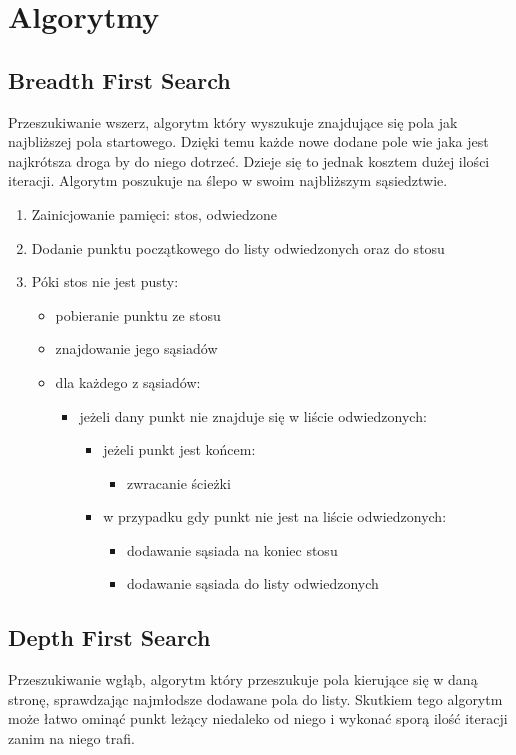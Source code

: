 \documentclass{article}
\begin{document}
\newpage

\section{Algorytmy}
\subsection{Breadth First Search}
Przeszukiwanie wszerz, algorytm który wyszukuje znajdujące się pola jak najbliższej pola startowego. Dzięki temu każde nowe dodane pole wie jaka jest najkrótsza droga by do niego dotrzeć. Dzieje się to jednak kosztem dużej ilości iteracji. Algorytm poszukuje na ślepo w swoim najbliższym sąsiedztwie.
\begin{enumerate}
\item Zainicjowanie pamięci: stos, odwiedzone
\item Dodanie punktu początkowego do listy odwiedzonych oraz do stosu
\item Póki stos nie jest pusty:
	\begin{itemize}
	\item pobieranie punktu ze stosu
	\item znajdowanie jego sąsiadów
	\item dla każdego z sąsiadów:
	\begin{itemize}
		\item jeżeli dany punkt nie znajduje się w liście odwiedzonych:
			\begin{itemize}
			\item jeżeli punkt jest końcem:
				\begin{itemize}
				\item zwracanie ścieżki
				\end{itemize}
			\item w przypadku gdy punkt nie jest na liście odwiedzonych:
				\begin{itemize}
				\item dodawanie sąsiada na koniec stosu
				\item dodawanie sąsiada do listy odwiedzonych				
				\end{itemize}
			\end{itemize}
		\end{itemize}		
	\end{itemize}
\end{enumerate}

\subsection{Depth First Search}
Przeszukiwanie wgłąb, algorytm który przeszukuje pola kierujące się w daną stronę, sprawdzając najmłodsze dodawane pola do listy. Skutkiem tego algorytm może łatwo ominąć punkt leżący niedaleko od niego i wykonać sporą ilość iteracji zanim na niego trafi.
\end{document}
